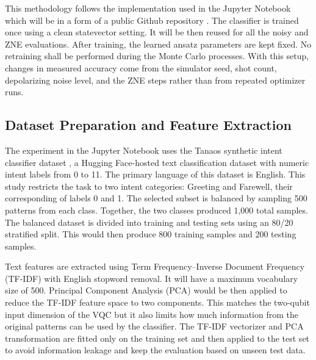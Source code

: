 \documentclass[conference]{IEEEtran}
\begin{document}
This methodology follows the implementation used in the Jupyter Notebook which will be in a form of a 
public Github repository \cite{b_project_repo}. The classifier
is trained once using a clean statevector setting.
It will be then reused for all the noisy and
ZNE evaluations. After training, the learned ansatz parameters are kept fixed.
No retraining shall be performed during the Monte Carlo processes. With this setup,
changes in measured accuracy come from the simulator seed, shot count,
depolarizing noise level, and the ZNE steps rather than from repeated
optimizer runs.

\subsection{Dataset Preparation and Feature Extraction}

The experiment in the Jupyter Notebook uses the Tanaos synthetic intent classifier dataset
\cite{b_tanaos_dataset}, a Hugging Face-hosted text classification
dataset with numeric intent labels from 0 to 11. The primary language of this dataset is English. 
This study restricts the task to two intent categories: Greeting and Farewell, their corresponding of labels 0 and 1. 
The selected subset is balanced by sampling 500 patterns from each class. Together, the two classes produced
1{,}000 total samples. The balanced dataset is divided into training and testing
sets using an 80/20 stratified split. This would then produce 800 training samples and 200
testing samples.

Text features are extracted using Term Frequency--Inverse Document Frequency
(TF-IDF) with English stopword removal. It will have a maximum vocabulary size of 500.
Principal Component Analysis (PCA) would be then applied to reduce the TF-IDF feature
space to two components. This matches the two-qubit input dimension of the VQC but it 
also limits how much information from the original patterns can be
used by the classifier. The TF-IDF vectorizer and PCA transformation are fitted
only on the training set and then applied to the test set to avoid information
leakage and keep the evaluation based on unseen test data.
\end{document}
